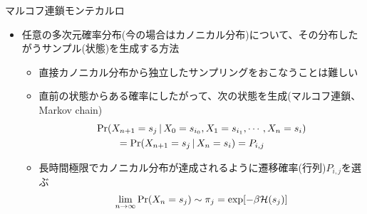 
\begin{frame}[t,fragile]{マルコフ連鎖モンテカルロ}
  \begin{itemize}
  \item 任意の多次元確率分布(今の場合はカノニカル分布)について、その分布したがうサンプル(状態)を生成する方法
    \begin{itemize}
    \item 直接カノニカル分布から独立したサンプリングをおこなうことは難しい
    \item 直前の状態からある確率にしたがって、次の状態を生成(マルコフ連鎖、Markov chain)
      \[
      \begin{split}
        &{\rm Pr}(X_{n+1}=s_j \,|\, X_0 = s_{i_0}, X_1 = s_{i_1}, \cdots, X_n = s_{i}) \\
        & \qquad = {\rm Pr}(X_{n+1}=s_j \,|\, X_n = s_{i}) = P_{i,j}
      \end{split}
      \]
    \item 長時間極限でカノニカル分布が達成されるように遷移確率(行列)$P_{i,j}$を選ぶ
      \[
      \lim_{n\rightarrow\infty}{\rm Pr}(X_n=s_j) \sim \pi_j = \exp[-\beta {\cal H}(s_j)]
      \]
    \end{itemize}
  \end{itemize}
\end{frame}
